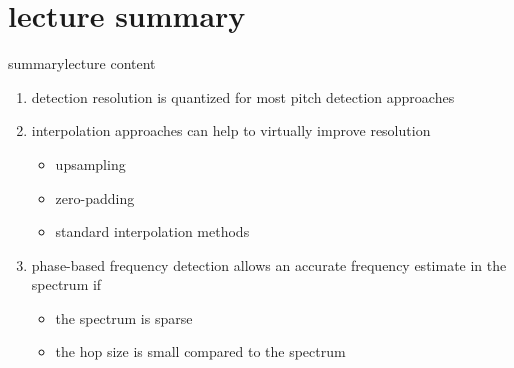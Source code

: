             
   \section[summary]{lecture summary}
        \begin{frame}{summary}{lecture content}
            \begin{enumerate}
                \item       detection resolution is quantized for most pitch detection approaches
                \smallskip
                \item<2->   interpolation approaches can help to virtually improve resolution
                    \begin{itemize}
                        \item   upsampling
                        \item   zero-padding
                        \item   standard interpolation methods
                    \end{itemize}
                \smallskip
                \item<3->   phase-based frequency detection allows an accurate frequency estimate in the spectrum if
                    \begin{itemize}
                        \item   the spectrum is sparse
                        \item   the hop size is small compared to the spectrum
                    \end{itemize}
            \end{enumerate}
        \end{frame}


